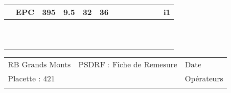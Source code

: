\documentclass[a4paper, landscape]{article}\usepackage[]{graphicx}\usepackage[]{color}
\begin{document}
{\begin{tabular}{|p{1cm}|p{2cm}|p{1.6cm}|p{1.6cm}|p{1.6cm}|p{1.6cm}|p{1.5cm}|p{1.5cm}|p{1.5cm}|p{1.5cm}|p{1.5cm}|p{7.5cm}|p{5cm}|}
   \rowcolor[gray]{0.95} \hline
20 & EPC & 395 & 9.5 & 32 & 36 &  &  &  &  &  &  & i1 \\ 
   \hline
 &  &  &  &  &  &  &  &  &  &  &  &  \\ 
   \rowcolor[gray]{0.95} \hline
 &  &  &  &  &  &  &  &  &  &  &  &  \\ 
   \hline
 &  &  &  &  &  &  &  &  &  &  &  &  \\ 
   \rowcolor[gray]{0.95} \hline
 &  &  &  &  &  &  &  &  &  &  &  &  \\ 
   \hline
 &  &  &  &  &  &  &  &  &  &  &  &  \\ 
   \rowcolor[gray]{0.95} \hline
 &  &  &  &  &  &  &  &  &  &  &  &  \\ 
   \hline
 &  &  &  &  &  &  &  &  &  &  &  &  \\ 
   \rowcolor[gray]{0.95} \hline
 &  &  &  &  &  &  &  &  &  &  &  &  \\ 
   \hline
 &  &  &  &  &  &  &  &  &  &  &  &  \\ 
   \rowcolor[gray]{0.95} \hline
 &  &  &  &  &  &  &  &  &  &  &  &  \\ 
   \hline
\end{tabular}
}

\begin{tabular}{p{10cm}p{10cm}p{8cm}}
  RB Grands Monts & PSDRF : Fiche de Remesure & Date \\ 
  Placette : 421 &  & Opérateurs \\ 
   &  &  \\ 
  \end{tabular}
\end{document}

